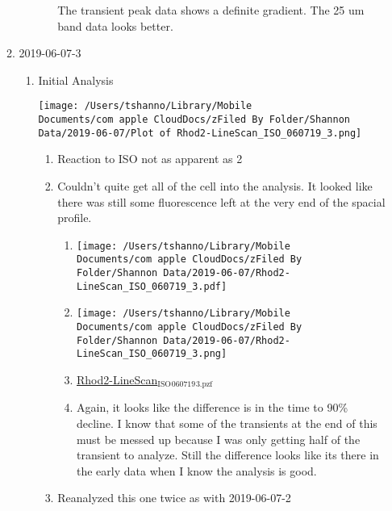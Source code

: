 \documentclass[11pt]{article}
\begin{document}
\begin{enumerate}
\begin{enumerate}
\begin{enumerate}
\begin{enumerate}
The transient peak data shows a definite gradient.  The 25 um band data looks better.
\end{enumerate}
\end{enumerate}
\item 2019-06-07-3
\label{sec:org9e20817}
\begin{enumerate}
\item Initial Analysis
\label{sec:org70b6b85}
\begin{center}
\texttt{[image: /Users/tshanno/Library/Mobile Documents/com~apple~CloudDocs/zFiled By Folder/Shannon Data/2019-06-07/Plot of Rhod2-LineScan\_ISO\_060719\_3.png]}
\end{center}
\begin{enumerate}
\item Reaction to ISO not as apparent as 2
\label{sec:orga04f262}
\item Couldn't quite get all of the cell into the analysis.  It looked like there was still some fluorescence left at the very end of the spacial profile.
\label{sec:org76e2498}
\begin{enumerate}
\item \begin{center}
\texttt{[image: /Users/tshanno/Library/Mobile Documents/com~apple~CloudDocs/zFiled By Folder/Shannon Data/2019-06-07/Rhod2-LineScan\_ISO\_060719\_3.pdf]}
\end{center}
\label{sec:org018c27e}
\item \begin{center}
\texttt{[image: /Users/tshanno/Library/Mobile Documents/com~apple~CloudDocs/zFiled By Folder/Shannon Data/2019-06-07/Rhod2-LineScan\_ISO\_060719\_3.png]}
\end{center}
\label{sec:orgf4545f4}
\item \href{file:///Users/tshanno/Library/Mobile Documents/com\~apple\~CloudDocs/zFiled By Folder/Shannon Data/2019-06-07/Rhod2-LineScan\_ISO\_060719\_3.pzf}{Rhod2-LineScan\(_{\text{ISO}}\)\(_{\text{060719}}\)\(_{\text{3.pzf}}\)}
\label{sec:org27d3575}
\item Again, it looks like the difference is in the time to 90\% decline.  I know that some of the transients at the end of this must be messed up because I was only getting half of the transient to analyze.  Still the difference looks like its there in the early data when I know the analysis is good.
\label{sec:org0869e48}
\end{enumerate}
\item Reanalyzed this one twice as with 2019-06-07-2

\end{enumerate}
\end{enumerate}
\end{enumerate}
\end{enumerate}
\end{document}
